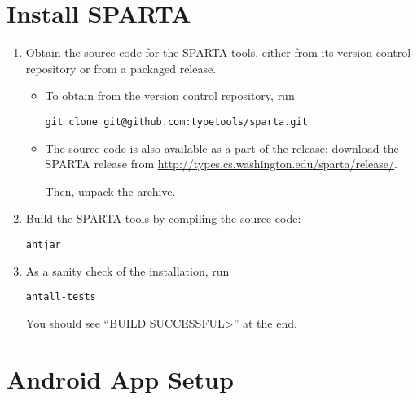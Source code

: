 



\section{Install SPARTA\label{sec:install}}

\begin{enumerate}

\item
  Obtain the source code for the SPARTA tools, either from its version
  control repository or from a packaged release.

\begin{itemize}
\item
  To obtain from the version control repository, run
\begin{Verbatim}
git clone git@github.com:typetools/sparta.git  
\end{Verbatim}
\item 

The source code is also available as a part of the release:
  download the SPARTA release from
  \url{http://types.cs.washington.edu/sparta/release/}.  

  Then, unpack the archive.
\end{itemize}

%


\item Build the SPARTA tools by compiling the source code:
\begin{alltt}
ant jar
\end{alltt}

\item
As a sanity check of the installation, run

\begin{alltt}
ant all-tests
\end{alltt}

You should see ``\<BUILD SUCCESSFUL>'' at the end.


\end{enumerate}


\section{Android App Setup\label{sec:antsetup}}

